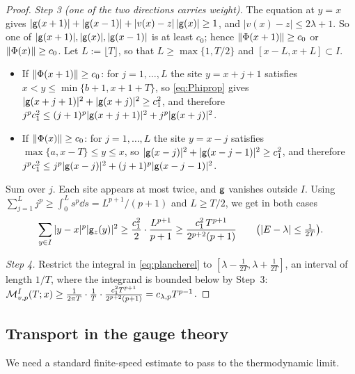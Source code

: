 \begin{proof}
\emph{Step 3 (one of the two directions carries weight).}  The equation at $y=x$ gives
$|\mathsf{g}(x+1)|+|\mathsf{g}(x-1)|+|v(x)-z|\,|\mathsf{g}(x)|\ge1$, and $|v(x)-z|\le2\lambda+1$.  So one of
$|\mathsf{g}(x+1)|,|\mathsf{g}(x)|,|\mathsf{g}(x-1)|$ is at least $c_0$; hence $\left\|\Phi(x+1)\right\|\ge c_0$ or
$\left\|\Phi(x)\right\|\ge c_0$.  Let $L:=\lfloor T\rfloor$, so that $L\ge\max\{1,T/2\}$ and
$[x-L,x+L]\subset I$.
\begin{itemize}
\item If $\left\|\Phi(x+1)\right\|\ge c_0$: for $j=1,\dots,L$ the site $y=x+j+1$ satisfies $x<y\le\min\{b+1,x+1+T\}$,
so \eqref{eq:Phiprop} gives $|\mathsf{g}(x+j+1)|^2+|\mathsf{g}(x+j)|^2\ge c_1^2$, and therefore
$j^pc_1^2\le(j+1)^p|\mathsf{g}(x+j+1)|^2+j^p|\mathsf{g}(x+j)|^2$.
\item If $\left\|\Phi(x)\right\|\ge c_0$: for $j=1,\dots,L$ the site $y=x-j$ satisfies $\max\{a,x-T\}\le y\le x$, so
$|\mathsf{g}(x-j)|^2+|\mathsf{g}(x-j-1)|^2\ge c_1^2$, and therefore
$j^pc_1^2\le j^p|\mathsf{g}(x-j)|^2+(j+1)^p|\mathsf{g}(x-j-1)|^2$.
\end{itemize}
Sum over $j$.  Each site appears at most twice, and $\mathsf{g}$ vanishes outside $I$.  Using
$\sum_{j=1}^Lj^p\ge\int_0^Ls^p\dd s=L^{p+1}/(p+1)$ and $L\ge T/2$, we get in both cases
\[
  \sum_{y\in I}|y-x|^p|\mathsf{g}_z(y)|^2\ge\frac{c_1^2}{2}\cdot\frac{L^{p+1}}{p+1}\ge\frac{c_1^2\,T^{p+1}}{2^{p+2}(p+1)}
  \qquad\bigl(|E-\lambda|\le\tfrac1{2T}\bigr).
\]

\emph{Step 4.}  Restrict the integral in \eqref{eq:plancherel} to $[\lambda-\frac1{2T},\lambda+\frac1{2T}]$,
an interval of length $1/T$, where the integrand is bounded below by Step~3:
$\mathcal{M}^I_{v,p}(T;x)\ge\frac{1}{2\pi T}\cdot\frac1T\cdot\frac{c_1^2T^{p+1}}{2^{p+2}(p+1)}=c_{\lambda,p}T^{p-1}$.
\end{proof}

\subsection{Transport in the gauge theory}\label{sec:dimer:lgt}

We need a standard finite-speed estimate to pass to the thermodynamic limit.

